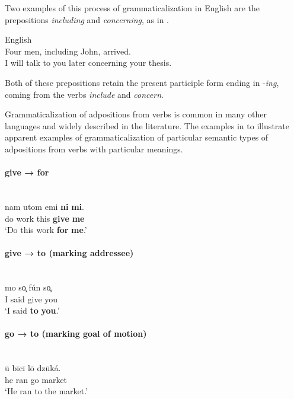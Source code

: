 \documentclass[output=paper]{langsci/langscibook}
\begin{document}
Two examples of this process of grammaticalization in English are the prepositions \textit{including} and \textit{concerning}, as in .

\ea\label{ex:dryer:1}
{English}\\
\ea  Four men, including John, arrived.\\
\ex  I will talk to you later concerning your thesis.\\
\z
\z

Both of these prepositions retain the present participle form ending in -\textit{ing}, coming from the verbs \textit{include} and \textit{concern}. 

Grammaticalization of adpositions from verbs is common in many other languages and widely described in the literature. The examples in  to  illustrate apparent examples of grammaticalization of particular semantic types of adpositions from verbs with particular meanings.

\paragraph*{give → for}

\ea\label{ex:dryer:2}
\\
\gll   nam  utom  emi  \textbf{ni}  \textbf{mi}.\\
       do  work  this  \textbf{give}  \textbf{me}\\
\glt   ‘Do this work \textbf{for} \textbf{me}.’
\z

\paragraph*{give → to (marking addressee)}

\ea\label{ex:dryer:3}
\\
\gll   mo  so̧  fún  so̧.\\
       I  said  give  you\\
\glt   ‘I said \textbf{to} \textbf{you}.’
\z

\paragraph*{go → to (marking goal of motion)}

\ea\label{ex:dryer:4}
\\
\gll   ū  bīcī  lō  dzūká.\\
       he  ran  go  market\\
\glt   ‘He ran to the market.’
\z
\end{document}
